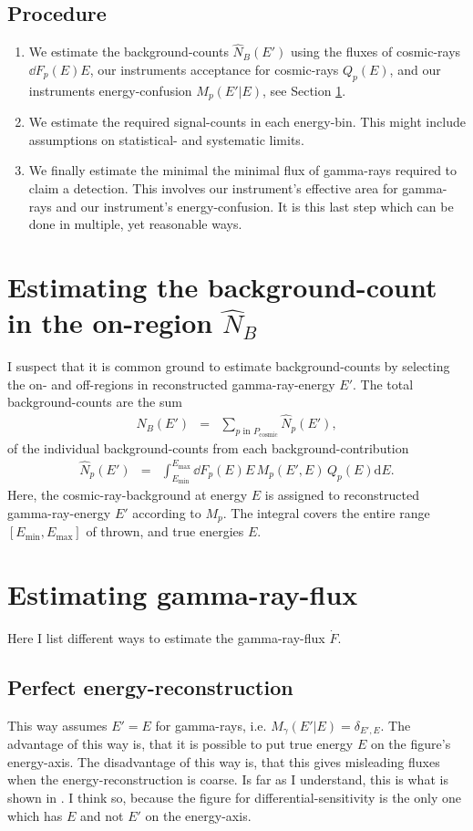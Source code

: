 \documentclass{article}%
\begin{document}
\subsection{Procedure}
%
\begin{enumerate}
\item We estimate the background-counts $\hat{N}_B(E')$ using the fluxes of cosmic-rays $\dd{F_p(E)}{E}$, our instruments acceptance for cosmic-rays $Q_p(E)$, and our instruments energy-confusion $M_p(E'\vert E)$, see Section \ref{SecEstimatingTheBackgroundCount}.
%
\item We estimate the required signal-counts in each energy-bin. This might include assumptions on statistical- and systematic limits.
%
\item We finally estimate the minimal the minimal flux of gamma-rays required to claim a detection. This involves our instrument's effective area for gamma-rays and our instrument's energy-confusion. It is this last step which can be done in multiple, yet reasonable ways.
%
\end{enumerate}
\section{Estimating the background-count in the on-region $\hat{N}_B$}
\label{SecEstimatingTheBackgroundCount}
%
I suspect that it is common ground to estimate background-counts by selecting the on- and off-regions in reconstructed gamma-ray-energy $E'$.
%
The total background-counts are the sum
%
\begin{eqnarray}
\hat{N}_B(E')
&=&
\sum_{
    p\,\,\text{in}\,\,P_\text{cosmic}
}{
    \hat{N}_p(E')
}
,
\label{EqHatNb}
\end{eqnarray}
%
of the individual background-counts from each background-contribution
%
\begin{eqnarray}
\hat{N}_p(E')
    &=&
\int_{E_\mathrm{min}}^{E_\mathrm{max}}
{
    \dd{F_p(E)}{E}\,M_p(E', E)\,Q_p(E) \mathrm{d}E
}.
\label{EqHatNp}
\end{eqnarray}
%
Here, the cosmic-ray-background at energy $E$ is assigned to reconstructed gamma-ray-energy $E'$ according to $M_p$.
%
The integral covers the entire range $[E_\text{min}, E_\text{max}]$ of thrown, and true energies $E$.
%
\section{Estimating gamma-ray-flux}
%
Here I list different ways to estimate the gamma-ray-flux $\dot{F}$.
%
\subsection{Perfect energy-reconstruction}
%
This way assumes $E' = E$ for gamma-rays, i.e. $M_\gamma(E'\vert E) = \delta_{E',E}$.
%
The advantage of this way is, that it is possible to put true energy $E$ on the figure's energy-axis.
%
The disadvantage of this way is, that this gives misleading fluxes when the energy-reconstruction is coarse.
%
Is far as I understand, this is what is shown in \cite{cta2018baseline}. I think so, because the figure for differential-sensitivity is the only one which has $E$ and not $E'$ on the energy-axis.
%
\end{document}
